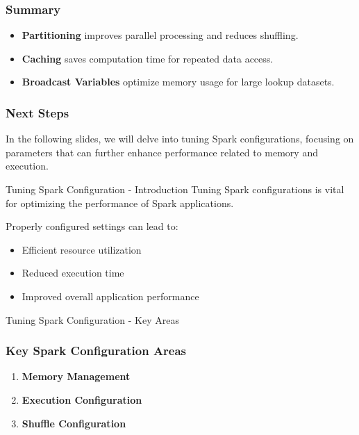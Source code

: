 \documentclass[aspectratio=169]{beamer}
\begin{document}
\begin{frame}
    \frametitle{Summary}
    \begin{itemize}
        \item \textbf{Partitioning} improves parallel processing and reduces shuffling.
        \item \textbf{Caching} saves computation time for repeated data access.
        \item \textbf{Broadcast Variables} optimize memory usage for large lookup datasets.
    \end{itemize}
\end{frame}

\begin{frame}
    \frametitle{Next Steps}
    In the following slides, we will delve into tuning Spark configurations, focusing on parameters that can further enhance performance related to memory and execution.
\end{frame}

\begin{frame}[fragile]{Tuning Spark Configuration - Introduction}
    Tuning Spark configurations is vital for optimizing the performance of Spark applications.
    
    Properly configured settings can lead to:
    \begin{itemize}
        \item Efficient resource utilization
        \item Reduced execution time
        \item Improved overall application performance
    \end{itemize}
\end{frame}

\begin{frame}[fragile]{Tuning Spark Configuration - Key Areas}
    \frametitle{Key Spark Configuration Areas}
    
    \begin{enumerate}
        \item \textbf{Memory Management}
        \item \textbf{Execution Configuration}
        \item \textbf{Shuffle Configuration}
    \end{enumerate}
\end{frame}
\end{document}
